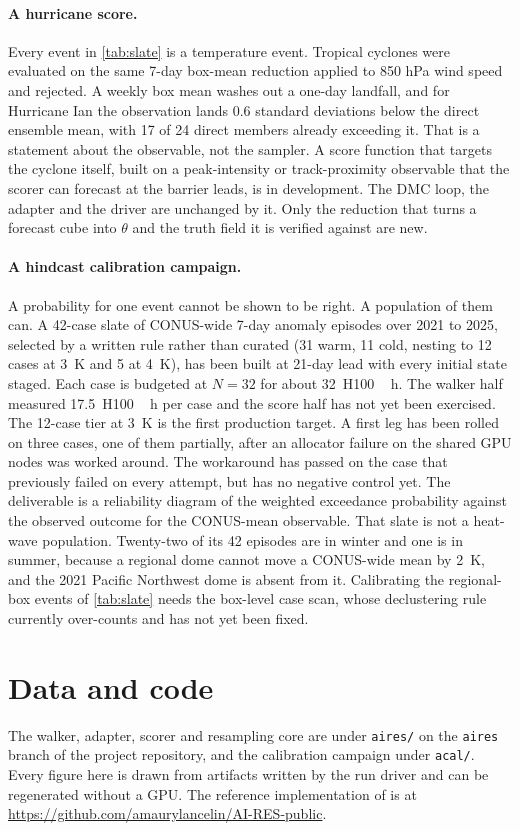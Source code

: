 \documentclass[10pt,twocolumn]{article}
\begin{document}
\paragraph{A hurricane score.}
Every event in \cref{tab:slate} is a temperature event. Tropical cyclones were evaluated on the same 7-day box-mean reduction applied to 850 hPa wind speed and rejected. A weekly box mean washes out a one-day landfall, and for Hurricane Ian the observation lands 0.6 standard deviations below the direct ensemble mean, with 17 of 24 direct members already exceeding it. That is a statement about the observable, not the sampler. A score function that targets the cyclone itself, built on a peak-intensity or track-proximity observable that the scorer can forecast at the barrier leads, is in development. The DMC loop, the adapter and the driver are unchanged by it. Only the reduction that turns a forecast cube into $\theta$ and the truth field it is verified against are new.

\paragraph{A hindcast calibration campaign.}
A probability for one event cannot be shown to be right. A population of them can. A 42-case slate of CONUS-wide 7-day anomaly episodes over 2021 to 2025, selected by a written rule rather than curated (31 warm, 11 cold, nesting to 12 cases at \SI{3}{K} and 5 at \SI{4}{K}), has been built at 21-day lead with every initial state staged. Each case is budgeted at $N = 32$ for about \SI{32}{H100\,h}. The walker half measured \SI{17.5}{H100\,h} per case and the score half has not yet been exercised. The 12-case tier at \SI{3}{K} is the first production target. A first leg has been rolled on three cases, one of them partially, after an allocator failure on the shared GPU nodes was worked around. The workaround has passed on the case that previously failed on every attempt, but has no negative control yet. The deliverable is a reliability diagram of the weighted exceedance probability against the observed outcome for the CONUS-mean observable. That slate is not a heat-wave population. Twenty-two of its 42 episodes are in winter and one is in summer, because a regional dome cannot move a CONUS-wide mean by \SI{2}{K}, and the 2021 Pacific Northwest dome is absent from it. Calibrating the regional-box events of \cref{tab:slate} needs the box-level case scan, whose declustering rule currently over-counts and has not yet been fixed.

\section*{Data and code}
The walker, adapter, scorer and resampling core are under \texttt{aires/} on the \texttt{aires} branch of the project repository, and the calibration campaign under \texttt{acal/}. Every figure here is drawn from artifacts written by the run driver and can be regenerated without a GPU. The reference implementation of \citet{lancelin2026airres} is at \url{https://github.com/amaurylancelin/AI-RES-public}.


\end{document}
